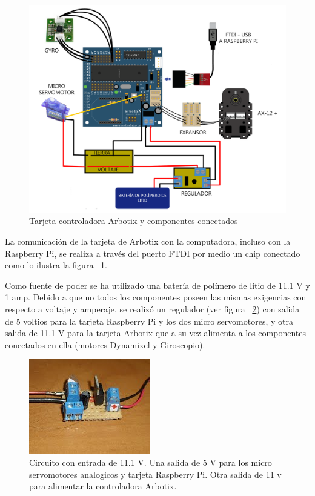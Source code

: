 \begin{figure}[hbtp]
\centering
\includegraphics[scale=0.2]{imagenes/arbotix_servo.png}
\caption{Tarjeta controladora Arbotix y componentes conectados }
\label{fig:arbotixConectados}
\end{figure}

La comunicación de la tarjeta de Arbotix con la computadora, incluso con la Raspberry Pi, se realiza a través del puerto FTDI por medio un chip conectado como lo ilustra la figura ~\ref{fig:arbotixConectados}.

Como fuente de poder se ha utilizado una batería de polímero de litio de 11.1 V y 1 amp. Debido a que no todos los componentes poseen las mismas exigencias con respecto a voltaje y amperaje, se realizó un regulador (ver figura ~\ref{fig:circuito}) con  salida de 5 voltios para la tarjeta Raspberry Pi y los dos micro servomotores, y otra salida de 11.1 V para la tarjeta Arbotix que a su vez alimenta a los componentes conectados en ella (motores Dynamixel y Giroscopio).

\begin{figure}[hbtp]
\centering
\includegraphics[scale=0.8]{imagenes/circuito.jpg}
\caption{Circuito con entrada de 11.1 V. Una salida de 5 V para los micro servomotores analogicos y tarjeta Raspberry Pi. Otra salida de 11 v para alimentar la controladora Arbotix.}
\label{fig:circuito}
\end{figure}

